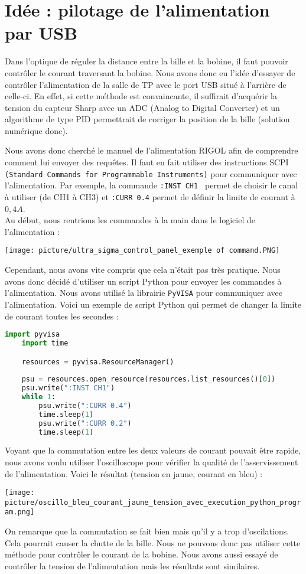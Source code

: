 \documentclass[12pt]{article}
\begin{document}
\section{Idée : pilotage de l'alimentation par USB}
Dans l'optique de réguler la distance entre la bille et la bobine, il faut pouvoir contrôler le courant traversant la bobine. Nous avons donc eu l'idée d'essayer de contrôler l'alimentation de la salle de TP avec le port USB situé à l'arrière de celle-ci. En effet, si cette méthode est convaincante, il suffirait d'acquérir la tension du capteur Sharp avec un ADC (Analog to Digital Converter) et un algorithme de type PID permettrait de corriger la position de la bille (solution numérique donc). \newline

Nous avons donc cherché le manuel de l'alimentation RIGOL afin de comprendre comment lui envoyer des requêtes. Il faut en fait utiliser des instructions SCPI \texttt{(Standard Commands for Programmable Instruments)} pour communiquer avec l'alimentation. Par exemple, la commande \texttt{:INST CH1 } permet de choisir le canal à utiliser (de CH1 à CH3) et \texttt{:CURR 0.4} permet de définir la limite de courant à $0,4A$. \\
Au début, nous rentrions les commandes à la main dans le logiciel de l'alimentation :
\begin{center}
    \texttt{[image: picture/ultra\_sigma\_control\_panel\_exemple of command.PNG]}
\end{center}
Cependant, nous avons vite compris que cela n'était pas très pratique. Nous avons donc décidé d'utiliser un script Python pour envoyer les commandes à l'alimentation. Nous avons utilisé la librairie \texttt{PyVISA} pour communiquer avec l'alimentation. Voici un exemple de script Python qui permet de changer la limite de courant toutes les secondes :
\begin{lstlisting}[language=python]
    import pyvisa
    import time

    resources = pyvisa.ResourceManager()
    
    psu = resources.open_resource(resources.list_resources()[0])
    psu.write(":INST CH1")
    while 1:
        psu.write(":CURR 0.4")
        time.sleep(1)
        psu.write(":CURR 0.2")
        time.sleep(1)
\end{lstlisting}
Voyant que la commutation entre les deux valeurs de courant pouvait être rapide, nous avons voulu utiliser l'oscilloscope pour vérifier la qualité de l'asservissement de l'alimentation. Voici le résultat (tension en jaune, courant en bleu) :
\begin{center}
    \texttt{[image: picture/oscillo\_bleu\_courant\_jaune\_tension\_avec\_execution\_python\_program.png]}
\end{center}
On remarque que la commutation se fait bien mais qu'il y a trop d'oscilations. Cela pourrait causer la chutte de la bille. Nous ne pouvons donc pas utiliser cette méthode pour contrôler le courant de la bobine. Nous avons aussi essayé de contrôler la tension de l'alimentation mais les résultats sont similaires.
\newpage
\end{document}
